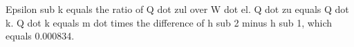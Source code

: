 Epsilon sub k equals the ratio of Q dot zul over W dot el. Q dot zu equals Q dot k. Q dot k equals m dot times the difference of h sub 2 minus h sub 1, which equals 0.000834.